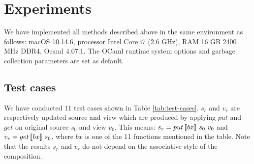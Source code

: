 \section{Experiments}

We have implemented all methods described above in the same environment as follows: macOS 10.14.6, processor Intel Core i7 (2.6 GHz), RAM 16 GB 2400 MHz DDR4, Ocaml 4.07.1. The OCaml runtime system options and garbage collection parameters are set as default.

\subsection{Test cases}

We have conducted 11 test cases shown in Table \ref{tab:test-cases}. $s_r$ and $v_r$ are respectively updated source and view which are produced by applying $put$ and $get$ on original source $s_0$ and view $v_0$. This means: $s_r = put \, [\![bx]\!] \ s_0 \ v_0$ and $v_r = get \, [\![bx]\!] \ s_0$, where $bx$ is one of the 11 functions mentioned in the table. Note that the results $s_r$ and $v_r$ do not depend on the associative style of the composition.

